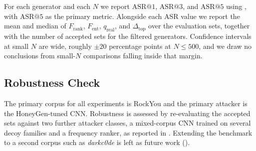 For each generator and each $N$ we report $\mathrm{ASR}@1$,
$\mathrm{ASR}@3$, and $\mathrm{ASR}@5$ using , with
$\mathrm{ASR}@5$ as the primary metric. Alongside each ASR value we
report the mean and median of $F_{\text{rank}}$, $F_{\text{ent}}$,
$q_{\text{real}}$, and $\Delta_{\text{top}}$ over the evaluation sets,
together with the number of accepted sets for the filtered generators.
Confidence intervals at small $N$ are wide, roughly $\pm 20$ percentage
points at $N \le 500$, and we draw no conclusions from small-$N$
comparisons falling inside that margin.

\subsection{Robustness Check}

The primary corpus for all experiments is RockYou and the primary
attacker is the HoneyGen-tuned CNN. Robustness is assessed by
re-evaluating the accepted sets against two further attacker classes, a
mixed-corpus CNN trained on several decoy families and a frequency
ranker, as reported in . Extending the benchmark
to a second corpus such as \emph{darkc0de} is left as future work
().